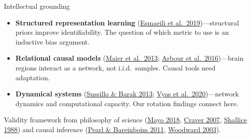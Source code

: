 \documentclass[aspectratio=169,11pt]{beamer}
\begin{document}
\begin{frame}{Intellectual grounding}
\begin{itemize}\setlength\itemsep{3pt}
  \item {\small \textbf{Structured representation learning} (\href{https://proceedings.mlr.press/v89/esmaeili19a}{Esmaeili et al.\ 2019})---structural priors improve identifiability. The question of which metric to use is an inductive bias argument.}
  \item {\small \textbf{Relational causal models} (\href{https://arxiv.org/abs/1309.6843}{Maier et al.\ 2013}; \href{https://www.auai.org/uai2016/proceedings/papers/217.pdf}{Arbour et al.\ 2016})---brain regions interact as a network, not i.i.d.\ samples. Causal tools need adaptation.}
  \item {\small \textbf{Dynamical systems} (\href{https://doi.org/10.1162/NECO_a_00409}{Sussillo \& Barak 2013}; \href{https://doi.org/10.1146/annurev-neuro-092619-094115}{Vyas et al.\ 2020})---network dynamics and computational capacity. Our rotation findings connect here.}
\end{itemize}

\vspace{0.3em}
{\small Validity framework from philosophy of science (\href{https://doi.org/10.1017/9781107286184}{Mayo 2018}, \href{https://doi.org/10.1093/acprof:oso/9780199299317.001.0001}{Craver 2007}, \href{https://doi.org/10.1017/CBO9780511526817}{Shallice 1988}) and causal inference (\href{https://arxiv.org/abs/1203.3519}{Pearl \& Bareinboim 2011}, \href{https://doi.org/10.1093/0195155270.001.0001}{Woodward 2003}).}
\end{frame}


\begin{frame}[plain]
\vfill
\begin{center}
  \setlength{\fboxrule}{2.5pt}%
\end{center}
\vfill
\end{frame}
\end{document}
